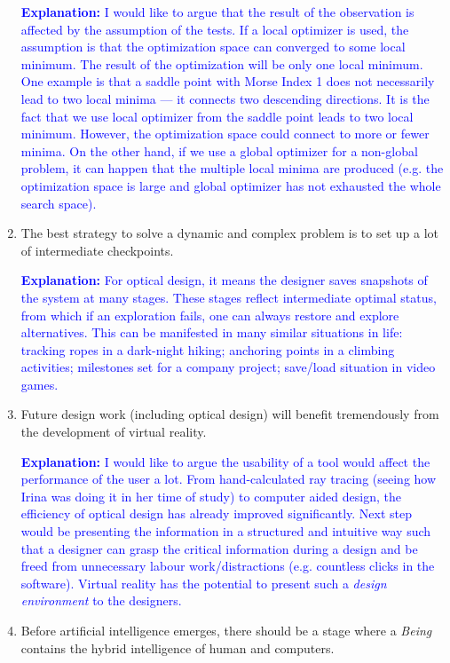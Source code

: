 \documentclass{dissertation}
\begin{document}
\begin{enumerate}
\textcolor{blue}{\textbf{Explanation:} I would like to argue that the result of the observation is affected by the assumption of the tests. If a local optimizer is used, the assumption is that the optimization space can converged to some local minimum. The result of the optimization will be only one local minimum. One example is that a saddle point with Morse Index 1 does not necessarily lead to two local minima --- it connects two descending directions. It is the fact that we use local optimizer from the saddle point leads to two local minimum. However, the optimization space could connect to more or fewer minima. On the other hand, if we use a global optimizer for a non-global problem, it can happen that the multiple local minima are produced (e.g. the optimization space is large and global optimizer has not exhausted the whole search space).}

\item The best strategy to solve a dynamic and complex problem is to set up a lot of intermediate checkpoints.  

\textcolor{blue}{\textbf{Explanation:} For optical design, it means the designer saves snapshots of the system at many stages. These stages reflect intermediate optimal status, from which if an exploration fails, one can always restore and explore alternatives. This can be manifested in many similar situations in life: tracking ropes in a dark-night hiking; anchoring points in a climbing activities; milestones set for a company project; save/load situation in video games. 
}

\item Future design work (including optical design) will benefit tremendously from the development of virtual reality.

\textcolor{blue}{\textbf{Explanation:} I would like to argue the usability of a tool would affect the performance of the user a lot. From hand-calculated ray tracing (seeing how Irina was doing it in her time of study) to computer aided design, the efficiency of optical design has already improved significantly. Next step would be presenting the information in a structured and intuitive way such that a designer can grasp the critical information during a design and be freed from unnecessary labour work/distractions (e.g. countless clicks in the software). Virtual reality has the potential to present such a \textit{design environment} to the designers.
}

\item Before artificial intelligence emerges, there should be a stage where a \textit{Being} contains the hybrid intelligence of human and computers. 


\end{enumerate}
\end{document}
